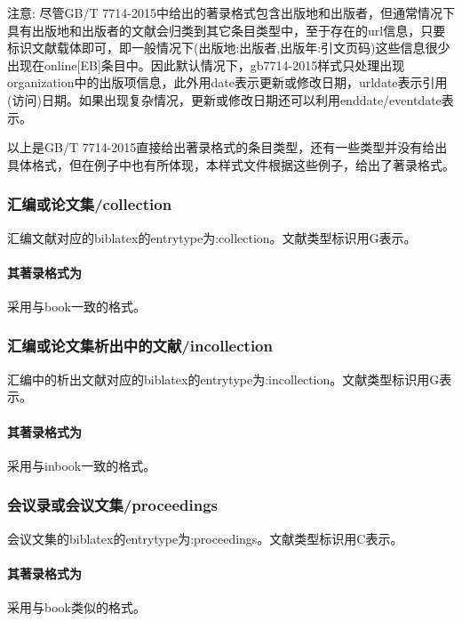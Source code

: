 注意: 尽管GB/T 7714-2015中给出的著录格式包含出版地和出版者，但通常情况下具有出版地和出版者的文献会归类到其它条目类型中，至于存在的url信息，只要标识文献载体即可，即一般情况下(出版地:出版者,出版年:引文页码)这些信息很少出现在online[EB]条目中。因此默认情况下，gb7714-2015样式只处理出现organization中的出版项信息，此外用date表示更新或修改日期，urldate表示引用(访问)日期。如果出现复杂情况，更新或修改日期还可以利用enddate/eventdate表示。

以上是GB/T 7714-2015直接给出著录格式的条目类型，还有一些类型并没有给出具体格式，但在例子中也有所体现，本样式文件根据这些例子，给出了著录格式。

\subsubsection{汇编或论文集/collection}

\begin{refentry}{}{}
汇编文献对应的biblatex的entrytype为:collection。文献类型标识用G表示。

\paragraph{其著录格式为} 采用与book一致的格式。
\end{refentry}

\subsubsection{汇编或论文集析出中的文献/incollection}
\begin{refentry}{}{}
汇编中的析出文献对应的biblatex的entrytype为:incollection。文献类型标识用G表示。

\paragraph{其著录格式为} 采用与inbook一致的格式。
\end{refentry}

\subsubsection{会议录或会议文集/proceedings}
\begin{refentry}{}{}
会议文集的biblatex的entrytype为:proceedings。文献类型标识用C表示。

\paragraph{其著录格式为} 采用与book类似的格式。
\end{refentry}

